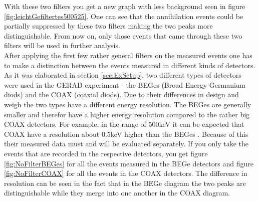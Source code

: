With these two filters you get a new graph with less background seen in figure \ref{fig:leichtGefiltertes500525}.
One can see that the annihilation events could be partially suppressed by these two filters making the two peaks more distinguishable.
From now on, only those events that came through these two filters will be used in further analysis.
\\

After applying the first few rather general filters on the measured events one has to make a distinction between the events measured in different kinds of detectors.
As it was elaborated in section \ref{sec:ExSetup}, two different types of detectors were used in the GERAD experiment - the BEGes (Broad Energy Germanium diods) and the COAX (coaxial diods). 
Due to their differences in design and weigh the two types have a different energy resolution. 
The BEGes are generally smaller and therefor have a higher energy resolution compared to the rather big COAX detectors.
For example, in the range of 500keV it can be expected that COAX have a resolution about 0.5keV higher than the BEGes \cite{agostini_allardt_bakalyarov_barabanov_baudis_bauer_bellotti_belogurov_belyaev_benato_et al._2017}. 
Because of this their measured data must and will be evaluated separately. 
If you only take the events that are recorded in the respective detectors, you get figure \ref{fig:NoFilterBEGes} for all the events measured in the BEGe detectors and figure \ref{fig:NoFilterCOAX} for all the events in the COAX detectors.
The difference in resolution can be seen in the fact that in the BEGe diagram the two peaks are distinguishable while they merge into one another in the COAX diagram.  
\\

